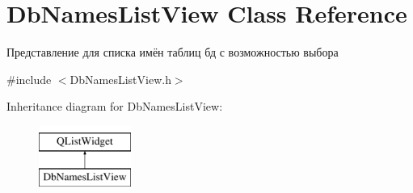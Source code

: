 \hypertarget{class_db_names_list_view}{}\section{Db\+Names\+List\+View Class Reference}
\label{class_db_names_list_view}


Представление для списка имён таблиц бд с возможностью выбора  




{\ttfamily \#include $<$Db\+Names\+List\+View.\+h$>$}

Inheritance diagram for Db\+Names\+List\+View\+:\begin{figure}[H]
\begin{center}
\leavevmode
\includegraphics[height=2.000000cm]{class_db_names_list_view}
\end{center}
\end{figure}
